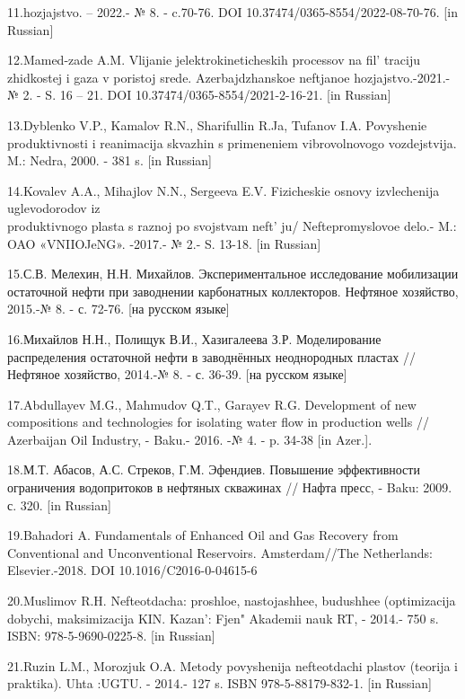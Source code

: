 \begin{references}
11.hozjajstvo. -- 2022.- № 8. - c.70-76. DOI
10.37474/0365-8554/2022-08-70-76. {[}in Russian{]}

12.Mamed-zade A.M. Vlijanie jelektrokineticheskih processov na
fil' traciju zhidkostej i gaza v poristoj srede.
Azerbajdzhanskoe neftjanoe hozjajstvo.-2021.- № 2. - S. 16 -- 21. DOI
10.37474/0365-8554/2021-2-16-21. {[}in Russian{]}

13.Dyblenko V.P., Kamalov R.N., Sharifullin R.Ja, Tufanov I.A.
Povyshenie produktivnosti i reanimacija skvazhin s primeneniem
vibrovolnovogo vozdejstvija. M.: Nedra, 2000. - 381 s. {[}in Russian{]}

14.Kovalev A.A., Mihajlov N.N., Sergeeva E.V. Fizicheskie osnovy
izvlechenija uglevodorodov iz \\produktivnogo plasta s raznoj po svojstvam
neft' ju/ Neftepromyslovoe delo.- M.: OAO «VNIIOJeNG».
-2017.- № 2.- S. 13-18. {[}in Russian{]}

15.С.В. Мелехин, Н.Н. Михайлов. Экспериментальное исследование
мобилизации остаточной нефти при заводнении карбонатных коллекторов.
Нефтяное хозяйство, 2015.-№ 8. - с. 72-76. {[}на русском языке{]}

16.Михайлов Н.Н., Полищук В.И., Хазигалеева З.Р. Моделирование
распределения остаточной нефти в заводнённых неоднородных пластах //
Нефтяное хозяйство, 2014.-№ 8. - с. 36-39. {[}на русском языке{]}

17.Abdullayev M.G., Mahmudov Q.T., Garayev R.G. Development of new
compositions and technologies for isolating water flow in production
wells // Azerbaijan Oil Industry, - Baku.- 2016. -№ 4. - p. 34-38 {[}in
Azer.{]}.

18.М.Т. Абасов, А.С. Стреков, Г.М. Эфендиев. Повышение эффективности
ограничения водопритоков в нефтяных скважинах // Нафта пресс, - Baku:
2009. с. 320. {[}in Russian{]}

19.Bahadori A. Fundamentals of Enhanced Oil and Gas Recovery from
Conventional and Unconventional Reservoirs. Amsterdam//The Netherlands:
Elsevier.-2018. DOI 10.1016/C2016-0-04615-6

20.Muslimov R.H. Nefteotdacha: proshloe, nastojashhee, budushhee
(optimizacija dobychi, maksimizacija KIN. Kazan': Fjen"
Akademii nauk RT, - 2014.- 750 s. ISBN: 978-5-9690-0225-8. {[}in
Russian{]}

21.Ruzin L.M., Morozjuk O.A. Metody povyshenija nefteotdachi plastov
(teorija i praktika). Uhta :UGTU. - 2014.- 127 s. ISBN
978-5-88179-832-1. {[}in Russian{]}
\end{references}

